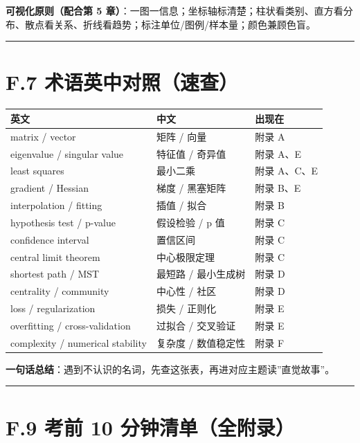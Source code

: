 \textbf{可视化原则（配合第 5
章）}：一图一信息；坐标轴标清楚；柱状看类别、直方看分布、散点看关系、折线看趋势；标注单位/图例/样本量；颜色兼顾色盲。

\begin{center}\rule{0.5\linewidth}{0.5pt}\end{center}

\section{F.7
术语英中对照（速查）}\label{f.7-ux672fux8bedux82f1ux4e2dux5bf9ux7167ux901fux67e5}

{\def\LTcaptype{none} %
\begin{longtable}[]{@{}lll@{}}
\toprule\noalign{}
英文 & 中文 & 出现在 \\
\midrule\noalign{}
\endhead
\bottomrule\noalign{}
\endlastfoot
matrix / vector & 矩阵 / 向量 & 附录 A \\
eigenvalue / singular value & 特征值 / 奇异值 & 附录 A、E \\
least squares & 最小二乘 & 附录 A、C、E \\
gradient / Hessian & 梯度 / 黑塞矩阵 & 附录 B、E \\
interpolation / fitting & 插值 / 拟合 & 附录 B \\
hypothesis test / p-value & 假设检验 / p 值 & 附录 C \\
confidence interval & 置信区间 & 附录 C \\
central limit theorem & 中心极限定理 & 附录 C \\
shortest path / MST & 最短路 / 最小生成树 & 附录 D \\
centrality / community & 中心性 / 社区 & 附录 D \\
loss / regularization & 损失 / 正则化 & 附录 E \\
overfitting / cross-validation & 过拟合 / 交叉验证 & 附录 E \\
complexity / numerical stability & 复杂度 / 数值稳定性 & 附录 F \\
\end{longtable}
}

\textbf{一句话总结}：遇到不认识的名词，先查这张表，再进对应主题读''直觉故事''。

\begin{center}\rule{0.5\linewidth}{0.5pt}\end{center}

\section{F.9 考前 10
分钟清单（全附录）}\label{f.9-ux8003ux524d-10-ux5206ux949fux6e05ux5355ux5168ux9644ux5f55}

